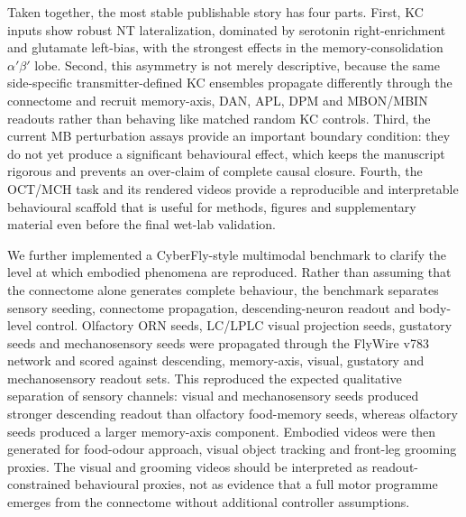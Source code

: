 \documentclass[10pt]{article}
\begin{document}
Taken together, the most stable publishable story has four parts. First, KC inputs show robust NT lateralization, dominated by serotonin right-enrichment and glutamate left-bias, with the strongest effects in the memory-consolidation $\alpha'\beta'$ lobe. Second, this asymmetry is not merely descriptive, because the same side-specific transmitter-defined KC ensembles propagate differently through the connectome and recruit memory-axis, DAN, APL, DPM and MBON/MBIN readouts rather than behaving like matched random KC controls. Third, the current MB perturbation assays provide an important boundary condition: they do not yet produce a significant behavioural effect, which keeps the manuscript rigorous and prevents an over-claim of complete causal closure. Fourth, the OCT/MCH task and its rendered videos provide a reproducible and interpretable behavioural scaffold that is useful for methods, figures and supplementary material even before the final wet-lab validation.

We further implemented a CyberFly-style multimodal benchmark to clarify the level at which embodied phenomena are reproduced. Rather than assuming that the connectome alone generates complete behaviour, the benchmark separates sensory seeding, connectome propagation, descending-neuron readout and body-level control. Olfactory ORN seeds, LC/LPLC visual projection seeds, gustatory seeds and mechanosensory seeds were propagated through the FlyWire v783 network and scored against descending, memory-axis, visual, gustatory and mechanosensory readout sets. This reproduced the expected qualitative separation of sensory channels: visual and mechanosensory seeds produced stronger descending readout than olfactory food-memory seeds, whereas olfactory seeds produced a larger memory-axis component. Embodied videos were then generated for food-odour approach, visual object tracking and front-leg grooming proxies. The visual and grooming videos should be interpreted as readout-constrained behavioural proxies, not as evidence that a full motor programme emerges from the connectome without additional controller assumptions.
\end{document}

